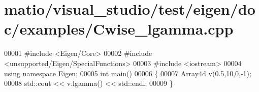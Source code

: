 \hypertarget{matio_2visual__studio_2test_2eigen_2doc_2examples_2_cwise__lgamma_8cpp_source}{}\section{matio/visual\+\_\+studio/test/eigen/doc/examples/\+Cwise\+\_\+lgamma.cpp}
\label{matio_2visual__studio_2test_2eigen_2doc_2examples_2_cwise__lgamma_8cpp_source}

\begin{DoxyCode}
00001 \textcolor{preprocessor}{#include <Eigen/Core>}
00002 \textcolor{preprocessor}{#include <unsupported/Eigen/SpecialFunctions>}
00003 \textcolor{preprocessor}{#include <iostream>}
00004 \textcolor{keyword}{using namespace }\hyperlink{namespace_eigen}{Eigen};
00005 \textcolor{keywordtype}{int} main()
00006 \{
00007   Array4d v(0.5,10,0,-1);
00008   std::cout << v.lgamma() << std::endl;
00009 \}
\end{DoxyCode}
